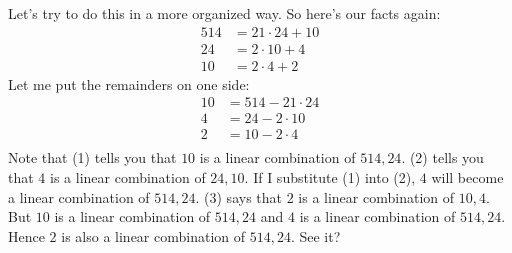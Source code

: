 Let's try to do this in a more organized way.
So here's our facts again:
\begin{align*}
514 &= 21 \cdot 24 + 10 \\
24  &= 2 \cdot 10 + 4 \\
10  &= 2 \cdot 4 + 2 
\end{align*}
Let me put the remainders on one side:
\begin{align*}
10 &= 514 - 21 \cdot 24 \tag{1} \\
4  &= 24  - 2 \cdot 10  \tag{2} \\
2  &= 10  - 2 \cdot 4   \tag{3} \\
\end{align*}
Note that (1) tells you that
$10$ is a linear combination of $514,24$.
(2) tells you that $4$ is a linear combination of $24,10$.
If I substitute (1) into (2), $4$ will become a linear
combination of $514,24$.
(3) says that $2$ is a linear combination of $10,4$.
But $10$ is a linear combination of $514,24$
and $4$ is a linear combination of $514,24$.
Hence $2$ is also a linear combination of $514,24$.
See it?

